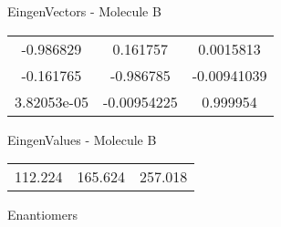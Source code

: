 \begin{multicols}{2}
\begin{center}
\vtab
 EingenVectors - Molecule B     \\
\vtab
\begin{tabular}{|c c c|}
-0.986829	 & 	0.161757	 & 	0.0015813	 \\
-0.161765	 & 	-0.986785	 & 	-0.00941039	 \\
3.82053e-05	 & 	-0.00954225	 & 	0.999954
\end{tabular}

\vtab
 EingenValues - Molecule B     \\
\vtab
\begin{tabular}{|c c c|}
112.224	 & 	165.624	 & 	257.018	 \\
\end{tabular}

\end{center}
\end{multicols}
\begin{center}
\vtab
\vtab
\textcolor{NavyBlue}{\Large Enantiomers}
\end{center}

 \newpage


